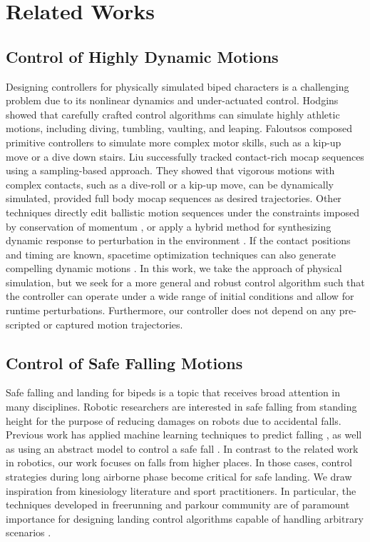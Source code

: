 \chapter{Related Works}

\section{Control of Highly Dynamic Motions}

Designing controllers for physically simulated biped characters
is a challenging problem due to its nonlinear dynamics and
under-actuated control.
Hodgins \etal \cite{Hodgins:1995:AHA,Wooten:1998:Phd} showed that 
carefully crafted control algorithms can simulate highly athletic 
motions, including diving, tumbling, vaulting, and leaping. 
Faloutsos \etal \cite{Faloutsos:2001:CCF} composed primitive 
controllers to simulate more complex motor skills, 
such as a kip-up move or a dive down stairs. 
Liu \etal \cite{Liu:2010:SCM} successfully tracked
contact-rich mocap sequences using a sampling-based approach. 
They showed that vigorous motions with complex contacts, such as a
dive-roll or a kip-up move, can be dynamically simulated, provided
full body mocap sequences as desired trajectories. 
Other techniques directly edit ballistic motion sequences
under the constraints imposed by conservation of momentum
\cite{Majkowska:2007:FPM,Sok:2010:EDH}, or apply a hybrid method for
synthesizing dynamic response to perturbation in the environment
\cite{Shapiro:2003:HCI}.  If the contact positions and timing are
known, spacetime optimization techniques can also generate compelling
dynamic motions
\cite{Liu:2002:SCD,Fang:2003:ESP,Safonova:2004:SPR,Sulejmanpavic:2004:APB}.
In this work, we take the approach of physical simulation, but we seek
for a more general and robust control algorithm such that the
controller can operate under a wide range of initial conditions and
allow for runtime perturbations. Furthermore, our controller does not
depend on any pre-scripted or captured motion trajectories.

\section{Control of Safe Falling Motions}

Safe falling and landing for bipeds is a topic that
receives broad attention in many disciplines. Robotic researchers are
interested in safe falling from standing height for the purpose of
reducing damages on robots due to accidental falls. Previous work has
applied machine learning techniques to predict falling
\cite{Kalyanakrishnan:2011:LPH}, as well as using an abstract model to
control a safe fall
\cite{Fujiwara:2002:FMC,Fujiwara:2007:OPF,Yun:2009:SFH}. In contrast
to the related work in robotics, our work focuses on falls from higher
places. In those cases, control strategies during long airborne phase
become critical for safe landing. We draw inspiration from
kinesiology literature and sport practitioners. In particular, the
techniques developed in freerunning and parkour community are of
paramount importance for designing landing control algorithms capable
of handling arbitrary scenarios
\cite{Edwardes:2009:TPF,HLJ:2011:URL}. 

